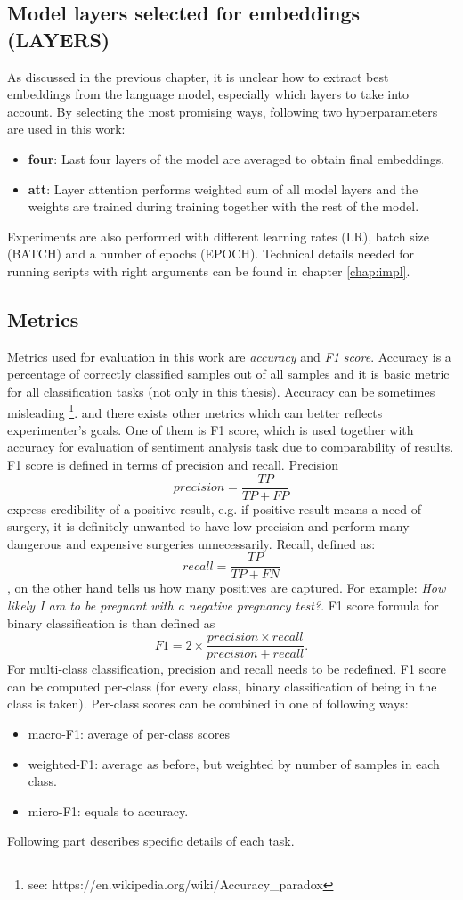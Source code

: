 \subsection{Model layers selected for embeddings (LAYERS)}
As discussed in the previous chapter, it is unclear how to extract best embeddings from the language model, especially which layers to take into account. By selecting the most promising ways, following two hyperparameters are used in this work:
\begin{itemize}
\item \textbf{four}: Last four layers of the model are averaged to obtain final embeddings.
\item \textbf{att}: Layer attention performs weighted sum of all model layers and the weights are trained during training together with the rest of the model.
\end{itemize}
Experiments are also performed with different learning rates (LR), batch size (BATCH) and a number of epochs (EPOCH). 
Technical details needed for running scripts with right arguments can be found in chapter \ref{chap:impl}.

\subsection{Metrics}
Metrics used for evaluation in this work are \textit{accuracy} and \textit{F1 score}. 
Accuracy is a percentage of correctly classified samples out of all samples and it is basic metric for all classification tasks (not only in this thesis). Accuracy can be sometimes misleading \footnote{see: https://en.wikipedia.org/wiki/Accuracy\_paradox}. and there exists other metrics which can better reflects experimenter's goals. One of them is F1 score, which is used together with accuracy for evaluation of sentiment analysis task due to comparability of results. F1 score is defined in terms of precision and recall. Precision  
$$precision = \frac{TP}{TP + FP}$$ express credibility of a positive result, e.g. if positive result means  a need of surgery, it is definitely unwanted to have low precision and perform many dangerous and expensive surgeries unnecessarily. Recall, defined as: $$recall = \frac{TP}{TP + FN}$$,
on the other hand tells us how many positives are captured. For example: \textit{How likely I am to be pregnant with a negative pregnancy test?}. F1 score formula for binary classification is than defined as
$$F1 = 2 \times \frac{precision \times recall}{precision + recall}.$$
For multi-class classification, precision and recall needs to be redefined. F1 score can be computed per-class (for every class, binary classification of being in the class is taken). Per-class scores can be combined in one of following ways:
\begin{itemize}
\item macro-F1: average of per-class scores
\item weighted-F1: average as before, but weighted by number of samples in each class.
\item micro-F1: equals to accuracy.
\end{itemize}
\par
Following part describes specific details of each task.
\newpage

\newpage

